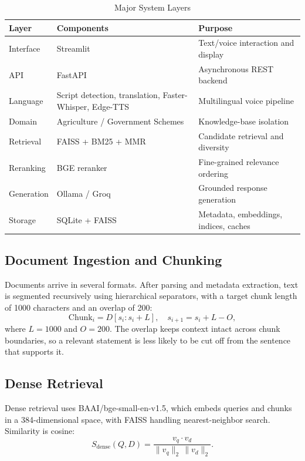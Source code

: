 \documentclass[10pt,twocolumn,letterpaper]{article}
\begin{document}
\begin{table}[t]
\caption{Major System Layers}
\label{tab:layers}
\centering
\footnotesize
\begin{tabular}{@{}p{1.1cm}p{3.0cm}p{3.1cm}@{}}
\toprule
\textbf{Layer} & \textbf{Components} & \textbf{Purpose} \\
\midrule
Interface & Streamlit & Text/voice interaction and display \\
API & FastAPI & Asynchronous REST backend \\
Language & Script detection, translation, Faster-Whisper, Edge-TTS & Multilingual voice pipeline \\
Domain & Agriculture / Government Schemes & Knowledge-base isolation \\
Retrieval & FAISS + BM25 + MMR & Candidate retrieval and diversity \\
Reranking & BGE reranker & Fine-grained relevance ordering \\
Generation & Ollama / Groq & Grounded response generation \\
Storage & SQLite + FAISS & Metadata, embeddings, indices, caches \\
\bottomrule
\end{tabular}
\end{table}

\subsection{Document Ingestion and Chunking}
Documents arrive in several formats. After parsing and metadata extraction, text is segmented recursively using hierarchical separators, with a target chunk length of 1000 characters and an overlap of 200:
\begin{equation}
\mathrm{Chunk}_i = D[s_i : s_i + L], \quad s_{i+1} = s_i + L - O,
\end{equation}
where $L = 1000$ and $O = 200$. The overlap keeps context intact across chunk boundaries, so a relevant statement is less likely to be cut off from the sentence that supports it.

\subsection{Dense Retrieval}
Dense retrieval uses BAAI/bge-small-en-v1.5, which embeds queries and chunks in a 384-dimensional space, with FAISS handling nearest-neighbor search. Similarity is cosine:
\begin{equation}
S_{\mathrm{dense}}(Q, D) = \frac{v_q \cdot v_d}{\lVert v_q \rVert_2 \, \lVert v_d \rVert_2}.
\end{equation}
\end{document}
